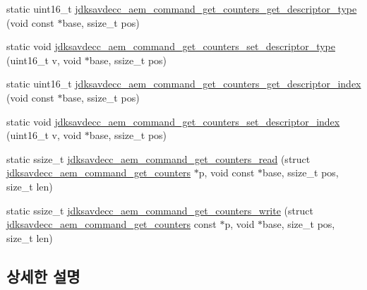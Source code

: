 \begin{DoxyCompactItemize}
\item 
static uint16\+\_\+t \hyperlink{group__command__get__counters_ga9ab413475f19c19680ca91c3784fea76}{jdksavdecc\+\_\+aem\+\_\+command\+\_\+get\+\_\+counters\+\_\+get\+\_\+descriptor\+\_\+type} (void const $\ast$base, ssize\+\_\+t pos)
\item 
static void \hyperlink{group__command__get__counters_ga665bf52a47ee7dddb31ef4a2013d504f}{jdksavdecc\+\_\+aem\+\_\+command\+\_\+get\+\_\+counters\+\_\+set\+\_\+descriptor\+\_\+type} (uint16\+\_\+t v, void $\ast$base, ssize\+\_\+t pos)
\item 
static uint16\+\_\+t \hyperlink{group__command__get__counters_gae010422d16acdfde787c2b6467165bf7}{jdksavdecc\+\_\+aem\+\_\+command\+\_\+get\+\_\+counters\+\_\+get\+\_\+descriptor\+\_\+index} (void const $\ast$base, ssize\+\_\+t pos)
\item 
static void \hyperlink{group__command__get__counters_gabf2b73fe6d83457db85b9b45ea3cfc57}{jdksavdecc\+\_\+aem\+\_\+command\+\_\+get\+\_\+counters\+\_\+set\+\_\+descriptor\+\_\+index} (uint16\+\_\+t v, void $\ast$base, ssize\+\_\+t pos)
\item 
static ssize\+\_\+t \hyperlink{group__command__get__counters_gab38135229a0699981241ddf77361992d}{jdksavdecc\+\_\+aem\+\_\+command\+\_\+get\+\_\+counters\+\_\+read} (struct \hyperlink{structjdksavdecc__aem__command__get__counters}{jdksavdecc\+\_\+aem\+\_\+command\+\_\+get\+\_\+counters} $\ast$p, void const $\ast$base, ssize\+\_\+t pos, size\+\_\+t len)
\item 
static ssize\+\_\+t \hyperlink{group__command__get__counters_ga9f15bd3b2fbf66748cde02c11f91af86}{jdksavdecc\+\_\+aem\+\_\+command\+\_\+get\+\_\+counters\+\_\+write} (struct \hyperlink{structjdksavdecc__aem__command__get__counters}{jdksavdecc\+\_\+aem\+\_\+command\+\_\+get\+\_\+counters} const $\ast$p, void $\ast$base, size\+\_\+t pos, size\+\_\+t len)
\end{DoxyCompactItemize}


\subsection{상세한 설명}


